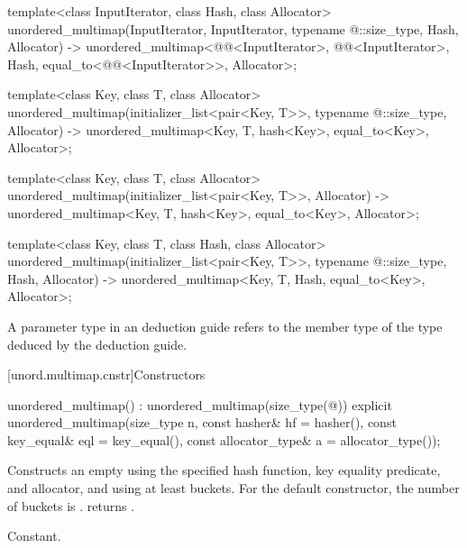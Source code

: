 \begin{codeblock}
{  template<class InputIterator, class Hash, class Allocator>
    unordered_multimap(InputIterator, InputIterator, typename @\seebelow@::size_type, Hash,
                       Allocator)
      -> unordered_multimap<@@<InputIterator>, @@<InputIterator>, Hash,
                            equal_to<@@<InputIterator>>, Allocator>;

  template<class Key, class T, class Allocator>
    unordered_multimap(initializer_list<pair<Key, T>>, typename @\seebelow@::size_type,
                       Allocator)
      -> unordered_multimap<Key, T, hash<Key>, equal_to<Key>, Allocator>;

  template<class Key, class T, class Allocator>
    unordered_multimap(initializer_list<pair<Key, T>>, Allocator)
      -> unordered_multimap<Key, T, hash<Key>, equal_to<Key>, Allocator>;

  template<class Key, class T, class Hash, class Allocator>
    unordered_multimap(initializer_list<pair<Key, T>>, typename @\seebelow@::size_type,
                       Hash, Allocator)
      -> unordered_multimap<Key, T, Hash, equal_to<Key>, Allocator>;
}
\end{codeblock}

\pnum
A  parameter type in an  deduction guide
refers to the  member type of the type deduced by the deduction guide.

[unord.multimap.cnstr]{Constructors}

%
\begin{itemdecl}
unordered_multimap() : unordered_multimap(size_type(@\seebelow@)) { }
explicit unordered_multimap(size_type n,
                            const hasher& hf = hasher(),
                            const key_equal& eql = key_equal(),
                            const allocator_type& a = allocator_type());
\end{itemdecl}

\begin{itemdescr}
\pnum
\effects
Constructs an empty  using the
specified hash function, key equality predicate, and allocator, and
using at least  buckets.  For the default constructor,
the number of buckets is .
 returns .

\pnum
\complexity
Constant.
\end{itemdescr}

